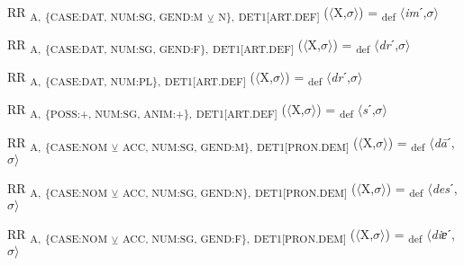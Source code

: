 {\begin{exe}
 RR \textsubscript{A,} \textsubscript{\{CASE:DAT, NUM:SG, GEND:M} \textsubscript{${\veebar}$}\textsubscript{ N\},} \textsubscript{DET1[ART.DEF]} ($\langle$X,$\sigma $$\rangle$) = \textsubscript{def} $\langle$\textit{im}ˊ,$\sigma $$\rangle$
\end{exe}

\begin{exe}
 RR \textsubscript{A,} \textsubscript{\{CASE:DAT, NUM:SG, GEND:F\},} \textsubscript{DET1[ART.DEF]} ($\langle$X,$\sigma $$\rangle$) = \textsubscript{def} $\langle$\textit{dr}ˊ,$\sigma $$\rangle$
\end{exe}

\begin{exe}
 RR \textsubscript{A,} \textsubscript{\{CASE:DAT, NUM:PL\},} \textsubscript{DET1[ART.DEF]} ($\langle$X,$\sigma $$\rangle$) = \textsubscript{def} $\langle$\textit{dr}ˊ,$\sigma $$\rangle$
\end{exe}

\begin{exe}
 RR \textsubscript{A,} \textsubscript{\{POSS:+, NUM:SG, ANIM:+\},} \textsubscript{DET1[ART.DEF]} ($\langle$X,$\sigma $$\rangle$) = \textsubscript{def} $\langle$\textit{s}ˊ,$\sigma $$\rangle$
\end{exe}

\begin{exe}
 RR \textsubscript{A,} \textsubscript{\{CASE:NOM} \textsubscript{${\veebar}$}\textsubscript{ ACC, NUM:SG, GEND:M\},} \textsubscript{DET1[PRON.DEM]} ($\langle$X,$\sigma $$\rangle$) = \textsubscript{def} $\langle$\textit{d\=a}ˊ,$\sigma $$\rangle$
\end{exe}

\begin{exe}
 RR \textsubscript{A,} \textsubscript{\{CASE:NOM} \textsubscript{${\veebar}$}\textsubscript{ ACC, NUM:SG, GEND:N\},} \textsubscript{DET1[PRON.DEM]} ($\langle$X,$\sigma $$\rangle$) = \textsubscript{def} $\langle$\textit{des}ˊ,$\sigma $$\rangle$
\end{exe}

\begin{exe}
 RR \textsubscript{A,} \textsubscript{\{CASE:NOM} \textsubscript{${\veebar}$}\textsubscript{ ACC, NUM:SG, GEND:F\},} \textsubscript{DET1[PRON.DEM]} ($\langle$X,$\sigma $$\rangle$) = \textsubscript{def} $\langle$\textit{diɐ}ˊ,$\sigma $$\rangle$
\end{exe}

}
